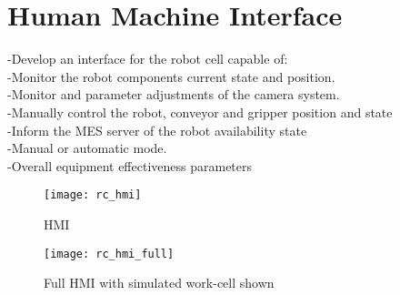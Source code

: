 \section{Human Machine Interface}
\label{sec:rc_hmi}
-Develop an interface for the robot cell capable of:\\
-Monitor the robot components current state and position.\\
-Monitor and parameter adjustments of the camera system.\\
-Manually control the robot, conveyor and gripper position and state\\
-Inform the MES server of the robot availability state\\
-Manual or automatic mode.\\
-Overall equipment effectiveness parameters\\	

	\begin{figure}[H]
		\centering
	    \texttt{[image: rc\_hmi]}
	    \caption{HMI}
		\label{fig:rc_hmi}
	\end{figure}
	
	\begin{figure}[H]
		\centering
	    \texttt{[image: rc\_hmi\_full]}
	    \caption{Full HMI with simulated work-cell shown}
		\label{fig:rc_hmi_full}
	\end{figure}